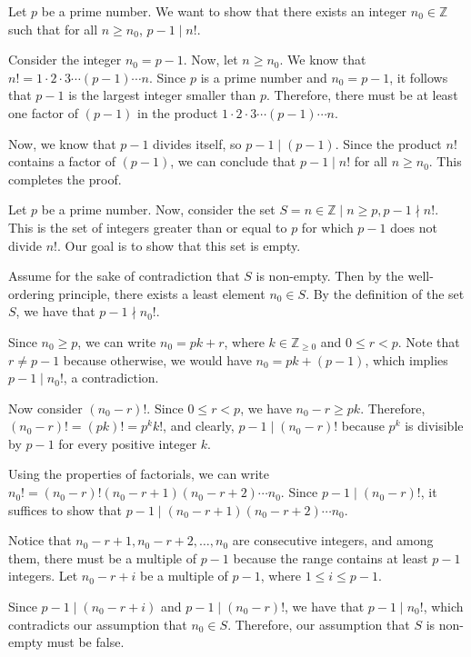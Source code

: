 \documentclass[12pt,openany]{book}
\begin{document}
	Let $p$ be a prime number. We want to show that there exists an integer $n_0 \in \mathbb{Z}$ such that for all $n \geq n_0$, $p-1 \mid n!$. 
	
	Consider the integer $n_0 = p - 1$. Now, let $n \geq n_0$. We know that $n! = 1 \cdot 2 \cdot 3 \cdots (p-1) \cdots n$. Since $p$ is a prime number and $n_0 = p - 1$, it follows that $p-1$ is the largest integer smaller than $p$. Therefore, there must be at least one factor of $(p-1)$ in the product $1 \cdot 2 \cdot 3 \cdots (p-1) \cdots n$. 
	
	Now, we know that $p-1$ divides itself, so $p-1 \mid (p-1)$. Since the product $n!$ contains a factor of $(p-1)$, we can conclude that $p-1 \mid n!$ for all $n \geq n_0$. This completes the proof.
	
	\newpage
	Let $p$ be a prime number. Now, consider the set $S = {n \in \mathbb{Z} \mid n \geq p, p-1 \nmid n!}$. This is the set of integers greater than or equal to $p$ for which $p-1$ does not divide $n!$. Our goal is to show that this set is empty.
	
	Assume for the sake of contradiction that $S$ is non-empty. Then by the well-ordering principle, there exists a least element $n_0 \in S$. By the definition of the set $S$, we have that $p-1 \nmid n_0!$.
	
	Since $n_0 \geq p$, we can write $n_0 = pk + r$, where $k \in \mathbb{Z}_{\geq 0}$ and $0 \leq r < p$. Note that $r \neq p-1$ because otherwise, we would have $n_0 = pk + (p-1)$, which implies $p-1 \mid n_0!$, a contradiction.

	Now consider $(n_0 - r)!$. Since $0 \leq r < p$, we have $n_0 - r \geq pk$. Therefore, $(n_0 - r)! = (pk)! = p^k k!$, and clearly, $p-1 \mid (n_0 - r)!$ because $p^k$ is divisible by $p-1$ for every positive integer $k$.
	
	Using the properties of factorials, we can write $n_0! = (n_0 - r)!(n_0 - r + 1)(n_0 - r + 2) \cdots n_0$. Since $p-1 \mid (n_0 - r)!$, it suffices to show that $p-1 \mid (n_0 - r + 1)(n_0 - r + 2) \cdots n_0$.
	
	Notice that $n_0 - r + 1, n_0 - r + 2, \dots, n_0$ are consecutive integers, and among them, there must be a multiple of $p-1$ because the range contains at least $p-1$ integers. Let $n_0 - r + i$ be a multiple of $p-1$, where $1 \leq i \leq p-1$.
	
	Since $p-1 \mid (n_0 - r + i)$ and $p-1 \mid (n_0 - r)!$, we have that $p-1 \mid n_0!$, which contradicts our assumption that $n_0 \in S$. Therefore, our assumption that $S$ is non-empty must be false.
	
\end{document}
